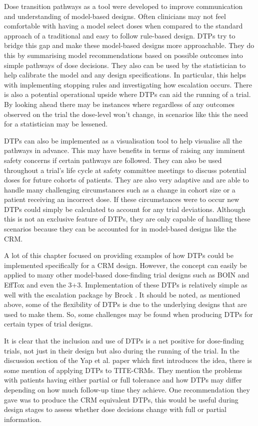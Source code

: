 Dose transition pathways as a tool were developed to improve communication and understanding of model-based designs. Often clinicians may not feel comfortable with having a model select doses when compared to the standard approach of a traditional and easy to follow rule-based design. DTPs try to bridge this gap and make these model-based designs more approachable. They do this by summarising model recommendations based on possible outcomes into simple pathways of dose decisions. They also can be used by the statistician to help calibrate the model and any design specifications. In particular, this helps with implementing stopping rules and investigating how escalation occurs. There is also a potential operational upside where DTPs can aid the running of a trial. By looking ahead there may be instances where regardless of any outcomes observed on the trial the dose-level won't change, in scenarios like this the need for a statistician may be lessened. 

DTPs can also be implemented as a visualisation tool to help visualise all the pathways in advance. This may have benefits in terms of raising any imminent safety concerns if certain pathways are followed. They can also be used throughout a trial's life cycle at safety committee meetings to discuss potential doses for future cohorts of patients. They are also very adaptive and are able to handle many challenging circumstances such as a change in cohort size or a patient receiving an incorrect dose. If these circumstances were to occur new DTPs could simply be calculated to account for any trial deviations. Although this is not an exclusive feature of DTPs, they are only capable of handling these scenarios because they can be accounted for in model-based designs like the CRM. 

A lot of this chapter focused on providing examples of how DTPs could be implemented specifically for a CRM design. However, the concept can easily be applied to many other model-based dose-finding trial designs such as BOIN and EffTox and even the 3+3. Implementation of these DTPs is relatively simple as well with the escalation package by Brock \cite{brockModularApproachDose2020}. It should be noted, as mentioned above, some of the flexibility of DTPs is due to the underlying designs that are used to make them. So, some challenges may be found when producing DTPs for certain types of trial designs. 

It is clear that the inclusion and use of DTPs is a net positive for dose-finding trials, not just in their design but also during the running of the trial. In the discussion section of the Yap et al. \cite{yapDoseTransitionPathways2017} paper which first introduces the idea, there is some mention of applying DTPs to TITE-CRMs. They mention the problems with patients having either partial or full tolerance and how DTPs may differ depending on how much follow-up time they achieve. One recommendation they gave was to produce the CRM equivalent DTPs, this would be useful during design stages to assess whether dose decisions change with full or partial information. 

